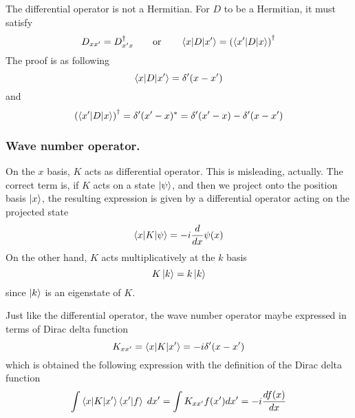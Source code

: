 \documentclass[../main.tex]{subfiles}
\begin{document}
The differential operator is not a Hermitian.
For $D$ to be a Hermitian, it must satisfy
\begin{equation*}
	D_{xx'}=D_{x'x}^\dagger\qquad\text{or}\qquad \braket{x|D|x'}=\left(\braket{x'|D|x}\right)^\dagger
\end{equation*}
The proof is as following
\begin{equation*}
	\braket{x|D|x'}=\delta'(x-x')
\end{equation*}
and
\begin{equation*}
	\left(\braket{x'|D|x}\right)^\dagger=\delta'(x'-x)^*=\delta'(x'-x)-\delta'(x-x')
\end{equation*}

\subsubsection*{Wave number operator.}
On the $x$ basis, $K$ acts as differential operator.
This is misleading, actually. 
The correct term is, if $K$ acts on a state $\ket{\psi}$, and then we project onto the position basis $\ket{x}$, the resulting expression is given by a differential operator acting on the projected state
\begin{equation*}
	\braket{x|K|\psi}=-i \frac{d }{dx}\psi(x)
\end{equation*}
On the other hand, $K$ acts multiplicatively at the $k$ basis
\begin{equation*}
	K\ket{k}=k \ket{k}
\end{equation*}
since $\ket{k}$ is an eigenstate of $K$.

Just like the differential operator, the wave number operator maybe expressed in terms of Dirac delta function
\begin{equation*}
	K_{xx'}=\braket{x|K|x'}=-i\delta'(x-x')
\end{equation*}
which is obtained the following expression with the definition of the Dirac delta function
\begin{equation*}
	\int \braket{x|K|x'}\braket{x'|f}\;dx'=\int K_{xx'}f(x')dx'=-i\frac{df(x)}{dx}
\end{equation*}
\end{document}
